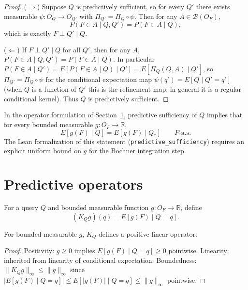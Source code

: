 \begin{proof}
($\Rightarrow$)
Suppose $Q$ is predictively sufficient, so for every $Q'$ there exists
measurable $\psi:O_Q\to O_{Q'}$ with $\Pi_{Q'}=\Pi_Q\circ\psi$.
Then for any $A\in\mathcal B(O_F)$,
\[
P(F\in A\mid Q,Q')
=
P(F\in A\mid Q),
\]
which is exactly $F\perp Q'\mid Q$.

($\Leftarrow$)
If $F\perp Q'\mid Q$ for all $Q'$, then for any $A$,
$P(F\in A\mid Q,Q')=P(F\in A\mid Q)$.
In particular $P(F\in A\mid Q')=E[P(F\in A\mid Q)\mid Q']
=E[\Pi_Q(Q,A)\mid Q']$,
so $\Pi_{Q'}=\Pi_Q\circ\psi$ for the conditional expectation map
$\psi(q')=E[Q\mid Q'=q']$ (when $Q$ is a function of $Q'$ this is the
refinement map; in general it is a regular conditional kernel).
Thus $Q$ is predictively sufficient.
\end{proof}

\begin{remark}
In the operator formulation of Section~\ref{sec:predictive-operators},
predictive sufficiency of $Q$ implies that for every bounded measurable
$g:O_F\to\mathbb R$,
\[
E[g(F)\mid Q] = E[g(F)\mid Q_*]
\qquad P\text{-a.s.}
\]
The Lean formalization of this statement (\texttt{predictive\_sufficiency})
requires an explicit uniform bound on $g$ for the Bochner integration step.
\end{remark}

\section{Predictive operators}\label{sec:predictive-operators}

\begin{definition}
For a query $Q$ and bounded measurable function
$g:O_F\to\mathbb R$, define
\[
(K_Q g)(q)
=
E[g(F)\mid Q=q].
\]
\end{definition}

\begin{proposition}
For bounded measurable $g$, $K_Q$ defines a positive linear operator.
\end{proposition}

\begin{proof}
Positivity: $g\ge0$ implies $E[g(F)\mid Q=q]\ge0$ pointwise.
Linearity: inherited from linearity of conditional expectation.
Boundedness: $\|K_Q g\|_\infty \le \|g\|_\infty$ since
$|E[g(F)\mid Q=q]|\le E[|g(F)|\mid Q=q]\le\|g\|_\infty$ pointwise.
\end{proof}

